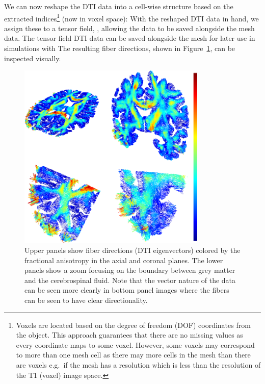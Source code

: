 We can now reshape the DTI data into a cell-wise structure based on
the extracted indices\footnote{Voxels are located based on the degree
  of freedom (DOF) coordinates from the  object. This
  approach guarantees that there are no missing values as every coordinate
  maps to some voxel. However, some voxels may correspond to more
  than one mesh cell as there may more cells in the mesh than there
  are voxels e.g.~if the mesh has a resolution which is less than the 
  resolution of the T1 (voxel) image space.} (now in voxel space):
\noindent With the reshaped DTI data in hand, we assign these to a {\fenics} tensor 
field, , allowing the data to be saved alongside the mesh data.
The {\fenics} tensor field DTI data can be saved alongside the mesh for later use 
in {\fenics} simulations with 
The resulting fiber directions, shown in Figure~\ref{fig:chp5:freesurfer-parc}, 
can be inspected visually.
\begin{figure}	
  \begin{center}
  \includegraphics[width=0.8\textwidth]{./graphics/chp5/fiber-fa-2cb.png}
  \end{center}
\caption{Upper panels show fiber directions (DTI eigenvectors) colored
  by the fractional anisotropy in the axial and coronal planes. The lower 
  panels show a zoom focusing on the boundary between grey matter and the 
  cerebrospinal fluid. Note that the vector nature of the data can be seen 
  more clearly in bottom panel images where the fibers can be seen to have 
  clear directionality.}
\label{fig:chp5:freesurfer-parc} 
\end{figure}

